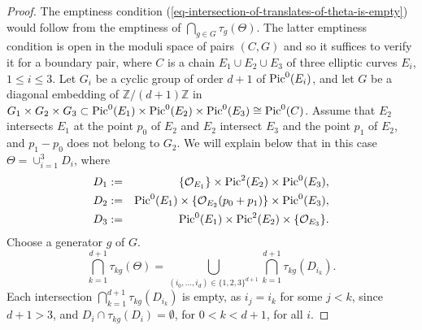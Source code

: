 \documentclass[12pt]{amsart}
\numberwithin{equation}{subsection}
\theoremstyle{plain}
\theoremstyle{definition}
\newcommand{\ZZ}{{\mathbb Z}}
\newcommand{\StructureSheaf}[1]{{\mathcal O}_{#1}}
\newcommand{\Pic}{{\rm Pic}}
\begin{document}
\begin{proof}
The emptiness condition (\ref{eq-intersection-of-translates-of-theta-is-empty}) would follow 
from the emptiness of
$
\bigcap_{g\in G}\tau_g(\Theta).
$
The latter emptiness condition is open in the moduli space of pairs $(C,G)$ and so it suffices to verify it for a boundary pair, where $C$ is a chain $E_1\cup E_2\cup E_3$ of three elliptic curves $E_i$, $1\leq i\leq 3$. Let $G_i$ be a cyclic group of order $d+1$ of $\Pic^0(E_i)$, and let $G$ be a diagonal embedding of $\ZZ/(d+1)\ZZ$ in $G_1\times G_2\times G_3\subset  \Pic^0(E_1)\times \Pic^0(E_2)\times \Pic^0(E_3)\cong \Pic^0(C)$. 
Assume that $E_2$ intersects $E_1$ at the point $p_0$ of $E_2$ and $E_2$ intersect $E_3$ and the point $p_1$ of $E_2$, and $p_1- p_0$ does not belong to $G_2$. We will explain below that 
in this case $\Theta=\cup_{i=1}^3 D_i$, where
\begin{eqnarray}
\label{eq-theta-divisor-of-a-chain-of-elliptic-curves}
D_1&:=&\{\StructureSheaf{E_1}\}\times\Pic^2(E_2)\times\Pic^0(E_3), 
\\
\nonumber
D_2&:=&\Pic^0(E_1)\times\{\StructureSheaf{E_2}(p_0+p_1)\}\times \Pic^0(E_3), 
\\ 
\nonumber
D_3&:=&\Pic^0(E_1)\times\Pic^2(E_2)\times\{\StructureSheaf{E_3}\}.
\end{eqnarray}
Choose a generator $g$ of $G$.
\[
\bigcap_{k=1}^{d+1}\tau_{kg}(\Theta)= 
\bigcup_{(i_0,\dots,i_d)\in \{1,2,3\}^{d+1}} \bigcap_{k=1}^{d+1} \tau_{kg}(D_{i_k}).
\]
Each intersection $\bigcap_{k=1}^{d+1} \tau_{kg}(D_{i_k})$ is empty, as $i_j=i_k$ for some $j<k$, since $d+1>3$, and $D_i\cap\tau_{kg}(D_i)=\emptyset$, for $0<k< d+1$, for all $i$.


\end{proof}
\end{document}
